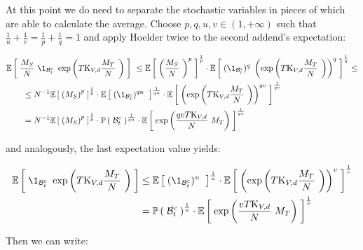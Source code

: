At this point we do need to separate the stochastic variables in pieces of which are able to calculate the average.
Choose $p,q,u,v \in (1, +\infty)$ such that $\frac{1}{u} + \frac{1}{v} = \frac{1}{p} + \frac{1}{q} = 1 $ and apply Hoelder twice to the second addend's expectation:

\begin{align*}
	&\E{
		\frac{\hmactive_S}{N}\
		\1_{\setB_t^c}\
		\exp \left(
		T
		\const_{\attraction,d}
		\frac{\hmactive_T}{N}\
		\right)
	}\
	\leq 
	\E{
		\left(
		\frac{\hmactive_S}{N}\
		\right)^p
	}^{\frac{1}{p}}
	\cdot
	\E{
		(\1_{\setB_t^c})^q\
		\left(
		\exp \left(
		T
		\const_{\attraction,d}
		\frac{\hmactive_T}{N}\
		\right)
		\right)^q
	}^{\frac{1}{q}} \leq
	\\
	&\qquad
	\leq
	N^{-1}
	\E{
		\left(\hmactive_S
		\right)^p
	}^{\frac{1}{p}}
	\cdot
	\E{
		(\1_{\setB_t^c})^{qu}\
	}^{\frac{1}{qu}}
	\cdot
	\E{
		\left(
		\exp \left(
		T
		\const_{\attraction,d}
		\frac{\hmactive_T}{N}\
		\right)
		\right)^{qv}
	}^{\frac{1}{qv}}
	\\
	& \qquad =
	N^{-1}
	\E{
		\left(\hmactive_S
		\right)^p
	}^{\frac{1}{p}}
	\cdot
	\PrbOf{\setB_t^c
	}^{\frac{1}{qu}}
	\cdot
	\E{
		\exp \left(
		\frac{
			qvT
			\const_{\attraction,d}
			}{N}\
		\hmactive_T
		\right)
	}^\frac{1}{qv}
\end{align*}

and analogously, the last expectation value yields:

\begin{align*}
\E{
	\1_{\setB_t^c}\
	\exp \left(
	T
	\const_{\attraction,d}
	\frac{\hmactive_T}{N}\
	\right)
} 
&\leq 
\E{
	(\1_{\setB_t^c})^{u}\
}^{\frac{1}{u}}
\cdot
\E{
	\left(
	\exp \left(
	T
	\const_{\attraction,d}
	\frac{\hmactive_T}{N}\
	\right)
	\right)^{v}
}^{\frac{1}{v}}
\\
&=
\PrbOf{\setB_t^c}^{\frac{1}{u}}
\cdot
\E{
	\exp \left(
	\frac{
		vT
		\const_{\attraction,d}
		}{N}\
	\hmactive_T
	\right)
}^{\frac{1}{v}}
\end{align*}

Then we can write:


